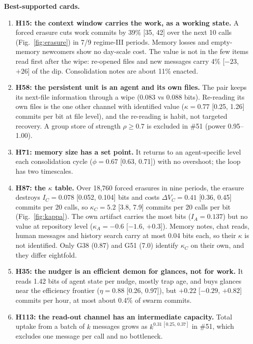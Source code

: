 \textbf{Best-supported cards.}
\begin{enumerate}
\item \textbf{H15: the context window carries the work, as a working state.} A forced erasure cuts work commits by 39\% [35, 42] over the next 10 calls (Fig.~\ref{fig:erasure}) in 7/9 regime-III periods. Memory losses and empty-memory newcomers show no day-scale cost. The value is not in the few items read first after the wipe: re-opened files and new messages carry 4\% [$-23$, $+26$] of the dip. Consolidation notes are about 11\% enacted.
\item \textbf{H58: the persistent unit is an agent and its own files.} The pair keeps its next-file information through a wipe (0.083 vs 0.088 bits). Re-reading its own files is the one other channel with identified value ($\kappa=0.77$ [0.25, 1.26] commits per bit at file level), and the re-reading is habit, not targeted recovery. A group store of strength $\rho\ge0.7$ is excluded in \#51 (power 0.95--1.00).
\item \textbf{H71: memory size has a set point.} It returns to an agent-specific level each consolidation cycle ($\phi=0.67$ [0.63, 0.71]) with no overshoot; the loop has two timescales.
\item \textbf{H87: the $\kappa$ table.} Over 18,760 forced erasures in nine periods, the erasure destroys $I_C=0.078$ [0.052, 0.104] bits and costs $\Delta V_C=0.41$ [0.36, 0.45] commits per 20 calls, so $\kappa_C=5.2$ [3.8, 7.9] commits per 20 calls per bit (Fig.~\ref{fig:kappa}). The own artifact carries the most bits ($I_A=0.137$) but no value at repository level ($\kappa_A=-0.6$ [$-1.6$, $+0.3$]). Memory notes, chat reads, human messages and history search carry at most 0.04 bits each, so their $\kappa$ is not identified. Only G38 (0.87) and G51 (7.0) identify $\kappa_C$ on their own, and they differ eightfold.
\item \textbf{H35: the nudger is an efficient demon for glances, not for work.} It reads 1.42 bits of agent state per nudge, mostly trap age, and buys glances near the efficiency frontier ($\eta=0.88$ [0.26, 0.97]), but $+0.22$ [$-0.29$, $+0.82$] commits per hour, at most about 0.4\% of swarm commits.
\item \textbf{H113: the read-out channel has an intermediate capacity.} Total uptake from a batch of $k$ messages grows as $k^{0.31\,[0.25,\,0.37]}$ in \#51, which excludes one message per call and no bottleneck.
\end{enumerate}

